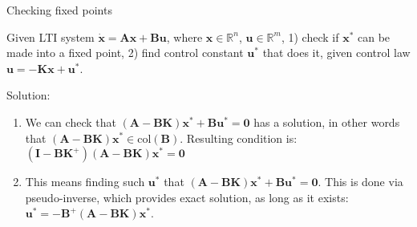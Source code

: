 \documentclass{beamer}
\begin{document}
\begin{frame}{Checking fixed points}
\begin{flushleft}

Given LTI system $\dot{\mathbf{x}} = \mathbf{A} \mathbf{x} + \mathbf{B} \mathbf{u}$, where $\mathbf{x} \in \mathbb{R}^n$, $\mathbf{u} \in \mathbb{R}^m$, 1) check if $\mathbf{x}^*$ can be made into a fixed point, 2) find control constant $\mathbf{u}^*$ that does it, given control law $\mathbf{u} = -\mathbf{K}\mathbf{x} + \mathbf{u}^*$.

\bigskip

Solution: 

\begin{enumerate}
    \item We can check that $(\mathbf{A}-\mathbf{B}\mathbf{K}) \mathbf{x}^* + \mathbf{B} \mathbf{u}^* = \mathbf{0}$ has a solution, in other words that $(\mathbf{A}-\mathbf{B}\mathbf{K}) \mathbf{x}^* \in \text{col}(\mathbf{B})$. Resulting condition is: $(\mathbf{I} - \mathbf{B}\mathbf{K}^+)(\mathbf{A}-\mathbf{B}\mathbf{K})\mathbf{x}^* = \mathbf{0}$
    \item This means finding such $\mathbf{u}^*$ that $(\mathbf{A}-\mathbf{B}\mathbf{K}) \mathbf{x}^* + \mathbf{B}\mathbf{u}^*= \mathbf{0}$. This is done via pseudo-inverse, which provides exact solution, as long as it exists: $\mathbf{u}^*= -\mathbf{B}^+(\mathbf{A}-\mathbf{B}\mathbf{K}) \mathbf{x}^*$.
\end{enumerate}

\end{flushleft}
\end{frame}
\end{document}
